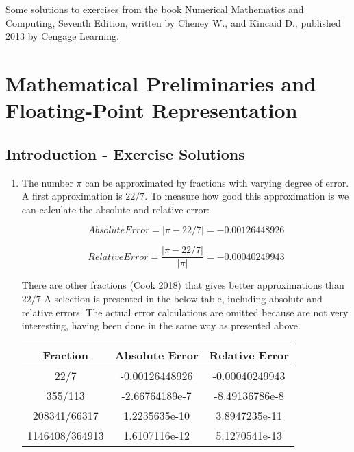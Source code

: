 \documentclass[10pt]{article}
\begin{document}
Some solutions to exercises from the book Numerical Mathematics and Computing, Seventh Edition, written by Cheney W., and Kincaid D., published 2013 by Cengage Learning.

\section[Mathematical Preliminaries and Floating-Point Representation]
{Mathematical Preliminaries and\\ Floating-Point Representation}


\subsection{Introduction - Exercise Solutions}

\begin{enumerate}

    \item The number \( \pi \) can be approximated by fractions with varying degree of error. A first approximation is \( 22 / 7 \). To measure how good this approximation is we can calculate the absolute and relative error:
    
    \[ Absolute Error = \left| \pi - 22 / 7 \right| = -0.00126448926 \]

    \[ Relative Error = \dfrac{\left| \pi - 22 / 7 \right|}{\left| \pi \right|} = -0.00040249943 \]

    There are other fractions (Cook 2018) that gives better approximations than \( 22 / 7 \) A selection is presented in the below table, including absolute and relative errors. The actual error calculations are omitted because are not very interesting,  having been done in the same way as presented above.

   \begin{center}
    \begin{tabular}{c c c }
        \hline
        Fraction & Absolute Error & Relative Error \\
        \hline
        22/7 & -0.00126448926 & -0.00040249943 \\
        355/113 & -2.66764189e-7 & -8.49136786e-8 \\
        208341/66317 & 1.2235635e-10 & 3.8947235e-11 \\
        1146408/364913 & 1.6107116e-12 & 5.1270541e-13 \\ 
        \hline
    \end{tabular}
   \end{center}


\end{enumerate}
\end{document}
